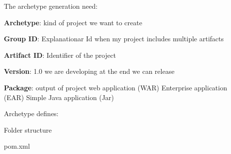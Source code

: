 \documentclass{article}
\begin{document}
The archetype generation need:
\begin{compactitem}
\item \textbf{Archetype}: kind of project we want to create
\item \textbf{Group ID}: Explanationar Id when my project includes multiple artifacts
\item \textbf{Artifact ID}: Identifier of the project
\item \textbf{Version}: 1.0 we are developing at the end we can release
\item \textbf{Package}: output of project web application (WAR) Enterprise application (EAR) Simple Java application (Jar)
\end{compactitem}

Archetype defines:
\begin{compactitem}
\item Folder structure
\item pom.xml
\end{compactitem}
\end{document}
